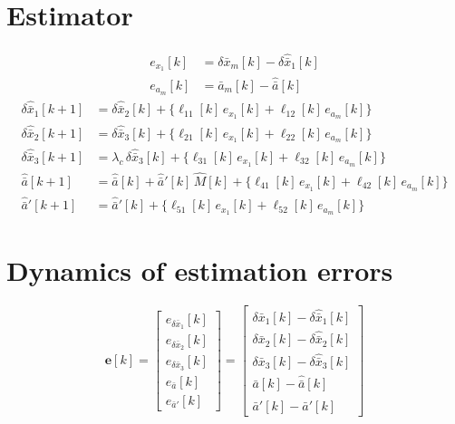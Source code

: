 \documentclass[11pt,a4paper]{ctexart}
\newcommand{\lc}{\lambda_c}
\newcommand{\bx}{\bar{x}}
\newcommand{\ba}{\bar{a}}
\begin{document}
\section{Estimator}

\[
\begin{aligned}
e_{x_1}[k] &= \delta\bx_m[k] - \delta\hat{\bx}_1[k] \\
e_{a_m}[k] &= \ba_m[k] - \hat{\ba}[k]
\end{aligned}
\]
\[
\begin{aligned}
\delta\hat{\bx}_1[k+1] &= \delta\hat{\bx}_2[k] + \big\{\ell_{11}[k]\,e_{x_1}[k] + \ell_{12}[k]\,e_{a_m}[k]\big\} \\
\delta\hat{\bx}_2[k+1] &= \delta\hat{\bx}_3[k] + \big\{\ell_{21}[k]\,e_{x_1}[k] + \ell_{22}[k]\,e_{a_m}[k]\big\} \\
\delta\hat{\bx}_3[k+1] &= \lc\,\delta\hat{\bx}_3[k] + \big\{\ell_{31}[k]\,e_{x_1}[k] + \ell_{32}[k]\,e_{a_m}[k]\big\} \\
\hat{\ba}[k+1] &= \hat{\ba}[k] + \hat{\ba}'[k]\,\hat{M}[k] + \big\{\ell_{41}[k]\,e_{x_1}[k] + \ell_{42}[k]\,e_{a_m}[k]\big\} \\
\hat{\ba}'[k+1] &= \hat{\ba}'[k] + \big\{\ell_{51}[k]\,e_{x_1}[k] + \ell_{52}[k]\,e_{a_m}[k]\big\}
\end{aligned}
\]

\section{Dynamics of estimation errors}

\[
\mathbf{e}[k] = \begin{bmatrix} e_{\delta\bx_1}[k] \\ e_{\delta\bx_2}[k] \\ e_{\delta\bx_3}[k] \\ e_{\ba}[k] \\ e_{\ba'}[k] \end{bmatrix}
= \begin{bmatrix} \delta\bx_1[k] - \delta\hat{\bx}_1[k] \\ \delta\bx_2[k] - \delta\hat{\bx}_2[k] \\ \delta\bx_3[k] - \delta\hat{\bx}_3[k] \\ \ba[k] - \hat{\ba}[k] \\ \ba'[k] - \hat{\ba}'[k] \end{bmatrix}
\]
\end{document}
